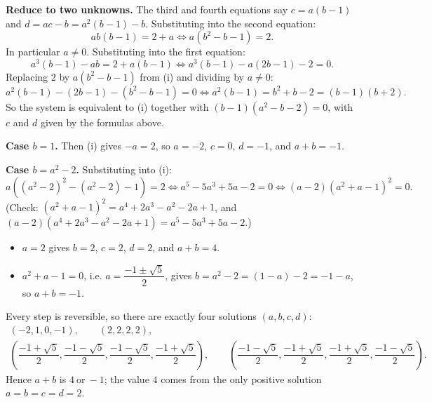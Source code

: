 \textbf{Reduce to two unknowns.} The third and fourth equations say $c=a(b-1)$ and $d=ac-b=a^2(b-1)-b$. Substituting into the second equation:
\[ab(b-1)=2+a\iff a\left(b^2-b-1\right)=2.\tag{i}\]
In particular $a\ne0$. Substituting into the first equation:
\[a^3(b-1)-ab=2+a(b-1)\iff a^3(b-1)-a(2b-1)-2=0.\]
Replacing $2$ by $a\left(b^2-b-1\right)$ from (i) and dividing by $a\ne0$:
\[a^2(b-1)-(2b-1)-\left(b^2-b-1\right)=0\iff a^2(b-1)=b^2+b-2=(b-1)(b+2).\]
So the system is equivalent to (i) together with $(b-1)\left(a^2-b-2\right)=0$, with $c$ and $d$ given by the formulas above.

\textbf{Case $b=1$.} Then (i) gives $-a=2$, so $a=-2$, $c=0$, $d=-1$, and $a+b=-1$.

\textbf{Case $b=a^2-2$.} Substituting into (i):
\[a\left(\left(a^2-2\right)^2-\left(a^2-2\right)-1\right)=2\iff a^5-5a^3+5a-2=0\iff(a-2)\left(a^2+a-1\right)^2=0.\]
(Check: $\left(a^2+a-1\right)^2=a^4+2a^3-a^2-2a+1$, and $(a-2)\left(a^4+2a^3-a^2-2a+1\right)=a^5-5a^3+5a-2$.)
\begin{itemize}
\item $a=2$ gives $b=2$, $c=2$, $d=2$, and $a+b=4$.
\item $a^2+a-1=0$, i.e. $a=\dfrac{-1\pm\sqrt5}{2}$, gives $b=a^2-2=(1-a)-2=-1-a$, so $a+b=-1$.
\end{itemize}
Every step is reversible, so there are exactly four solutions $(a,b,c,d)$:
\begin{gather*}
(-2,1,0,-1),\qquad(2,2,2,2),\\
\left(\dfrac{-1+\sqrt5}{2},\dfrac{-1-\sqrt5}{2},\dfrac{-1-\sqrt5}{2},\dfrac{-1+\sqrt5}{2}\right),\qquad\left(\dfrac{-1-\sqrt5}{2},\dfrac{-1+\sqrt5}{2},\dfrac{-1+\sqrt5}{2},\dfrac{-1-\sqrt5}{2}\right).
\end{gather*}
Hence $a+b$ is $\boxed{4\ \text{or}\ -1}$; the value $4$ comes from the only positive solution $a=b=c=d=2$.
